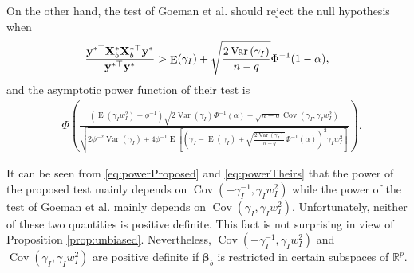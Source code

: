 \documentclass[bj]{imsart}
\DeclareMathOperator{\myE}{E}
\DeclareMathOperator{\myVar}{Var}
\DeclareMathOperator{\myCov}{Cov}
\newcommand{\By}{\mathbf{y}}    \newcommand{\Bz}{\mathbf{z}}
\newcommand{\bfsym}[1]{\ensuremath{\boldsymbol{#1}}}
\def\bbeta{\bfsym \beta}
\theoremstyle{plain}
\theoremstyle{definition}
\theoremstyle{remark}
\begin{document}
On the other hand, the test of Goeman {\rm et al.} \cite{Goeman2006} should reject the null hypothesis when
\begin{equation*}
        \frac{
            \By^{*\top} \BX_b^* \BX_b^{*\top} \By^*
        }{
            \By^{*\top} \By^*
        } 
        >
        \myE (\gamma_I)
        +\sqrt{
            \frac{2\myVar\left( \gamma_I \right)}{n-q} 
        }
        \Phi^{-1}(1-\alpha),
\end{equation*}
and the asymptotic power function of their test is
\begin{equation}\label{eq:powerTheirs}
    \begin{split}
    &\Phi\left( 
        \frac{
            \left( \myE (\gamma_I w_I^2) + \phi^{-1} \right)
            \sqrt{2\myVar\left( \gamma_I \right)} 
            \Phi^{-1}(\alpha)
            +
            \sqrt{n-q}
            \myCov\left( \gamma_I, \gamma_I w_I^2 \right)
        }{
            \sqrt{
                2\phi^{-2} \myVar ( \gamma_I ) 
                +
                4\phi^{-1}
    \myE\left[ 
        \left( \gamma_I -\myE(\gamma_I) +\sqrt{\frac{2\myVar (\gamma_I)}{n-q}} \Phi^{-1}(\alpha) \right)^2
        \gamma_I w_I^2
    \right]
            }
        } 
    \right).
    \end{split}
\end{equation}

It can be seen from \eqref{eq:powerProposed} and \eqref{eq:powerTheirs} that the power of the proposed test mainly depends on $\myCov (-\gamma_I^{-1}, \gamma_I w_I^2)$ while the power of the test of Goeman {\rm et al.} \cite{Goeman2006} mainly depends on $\myCov(\gamma_I, \gamma_I w_I^2)$.  
Unfortunately, neither of these two quantities is positive definite.
This fact is not surprising in view of Proposition \ref{prop:unbiased}.
Nevertheless, $\myCov (-\gamma_I^{-1}, \gamma_I w_I^2)$ and $\myCov(\gamma_I, \gamma_I w_I^2)$ are positive definite if $\bbeta_b$ is restricted  in certain subspaces of $\mathbb R^p$.
\end{document}

